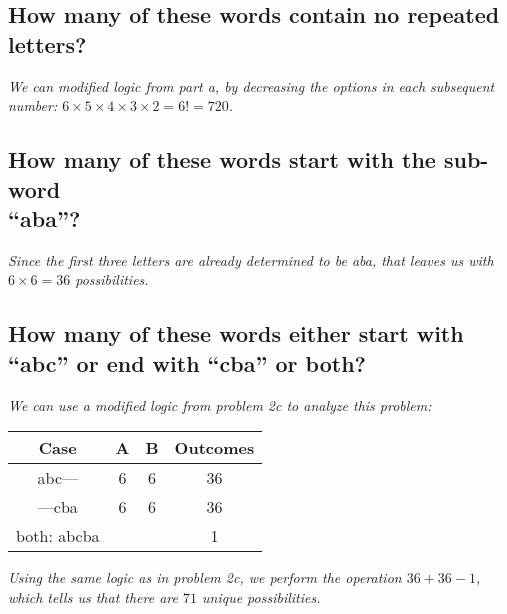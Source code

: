 \documentclass{article}
\begin{document}
\subsection{How many of these words contain no repeated letters?}
\hspace{1cm}\textit{We can modified logic from part a, by decreasing the options in each subsequent number:
    $6\times 5\times 4\times 3\times 2 = 6! = 720$.}
\subsection{How many of these words start with the sub-word \\ “aba”?}
\hspace{1cm}\textit{Since the first three letters are already determined to be aba, that leaves us with
    $6\times 6 = 36$ possibilities.}
\clearpage
\subsection{How many of these words either start with “abc” or end with “cba” or both?}
\hspace{1cm}\textit{We can use a modified logic from problem 2c to analyze this problem:}
\begin{center}
    \begin{tabular}{c|c|c|c}
        Case & A & B & Outcomes \\
        \hline
        abc--- & 6 & 6 & 36 \\
        \hline
        ---cba & 6 & 6 & 36 \\
        \hline
        both: abcba &  &  & 1 \\
        \hline
    \end{tabular}
\end{center}
\hspace{1cm}\textit{Using the same logic as in problem 2c, we perform the operation $36+36-1$,
    which tells us that there are $71$ unique possibilities.}
\end{document}
